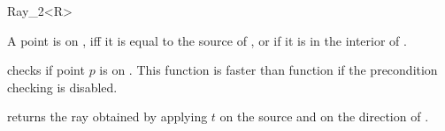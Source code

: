 \begin{ccRefClass}{Ray_2<R>}
       {}
\ccGlue
{}
       {}

       {A point is on \ccVar, iff it is equal to the source
        of \ccVar, or if it is in the interior of \ccVar.}

       {checks if point $p$ is on \ccVar. This function is faster
        than function  if the precondition 
	checking is disabled.
        }


       {returns the ray obtained by applying $t$ on the source
        and on the direction of \ccVar.}

\ccSeeAlso
{}

\end{ccRefClass} 

